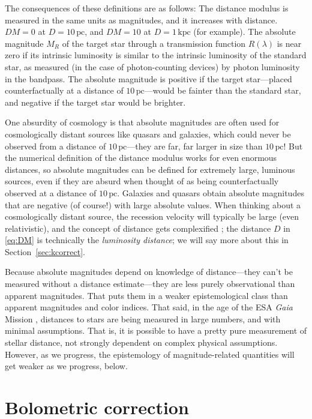 \documentclass[10pt]{article}
\newcommand{\sectionname}{Section}
\newcommand{\secref}[1]{\sectionname~\ref{#1}}
\newcommand{\unit}[1]{\mathrm{#1}}
\newcommand{\pc}{\unit{pc}}
\newcommand{\kpc}{\unit{kpc}}
\begin{document}
The consequences of these definitions are as follows:
The distance modulus is measured in the same units as magnitudes, and it increases with distance.
$DM=0$ at $D=10\,\pc$, and $DM=10$ at $D=1\,\kpc$ (for example).
The absolute magnitude $M_R$ of the target star through a transmission function $R(\lambda)$ is near zero if its intrinsic luminosity is similar to the intrinsic luminosity of the standard star, as measured (in the case of photon-counting devices) by photon luminosity in the bandpass.
The absolute magnitude is positive if the target star---placed counterfactually at a distance of $10\,\pc$---would be fainter than the standard star, and negative if the target star would be brighter.

One absurdity of cosmology is that absolute magnitudes are often used for cosmologically distant sources like quasars and galaxies, which could never be observed from a distance of $10\,\pc$---they are far, far larger in size than $10\,\pc$!
But the numerical definition of the distance modulus works for even enormous distances, so absolute magnitudes can be defined for extremely large, luminous sources, even if they are absurd when thought of as being counterfactually observed at a distance of $10\,\pc$.
Galaxies and quasars obtain absolute magnitudes that are negative (of course!) with large absolute values.
When thinking about a cosmologically distant source, the recession velocity will typically be large (even relativistic), and the concept of distance gets complexified \cite{distances}; the distance $D$ in \eqref{eq:DM} is technically the \emph{luminosity distance}; we will say more about this in \secref{sec:kcorrect}.

Because absolute magnitudes depend on knowledge of distance---they can't be measured without a distance estimate---they are less purely observational than apparent magnitudes.
That puts them in a weaker epistemological class than apparent magnitudes and color indices.
That said, in the age of the ESA \textsl{Gaia} Mission \cite{gaia}, distances to stars are being measured in large numbers, and with minimal assumptions.
That is, it is possible to have a pretty pure measurement of stellar distance, not strongly dependent on complex physical assumptions.
However, as we progress, the epistemology of magnitude-related quantities will get weaker as we progress, below.

\section{Bolometric correction}\label{sec:bc}
\end{document}

